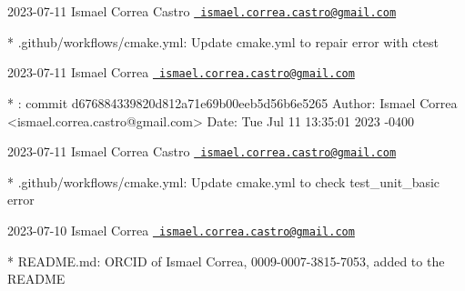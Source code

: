  2023-\/07-\/11 Ismael Correa Castro \href{mailto:ismael.correa.castro@gmail.com}{\texttt{ ismael.\+correa.\+castro@gmail.\+com}} \begin{DoxyVerb}* .github/workflows/cmake.yml: Update cmake.yml to repair error with
ctest
\end{DoxyVerb}
 2023-\/07-\/11 Ismael Correa \href{mailto:ismael.correa.castro@gmail.com}{\texttt{ ismael.\+correa.\+castro@gmail.\+com}} \begin{DoxyVerb}* : commit d676884339820d812a71e69b00eeb5d56b6e5265 Author: Ismael
Correa <ismael.correa.castro@gmail.com> Date:   Tue Jul 11 13:35:01
2023 -0400
\end{DoxyVerb}
 2023-\/07-\/11 Ismael Correa Castro \href{mailto:ismael.correa.castro@gmail.com}{\texttt{ ismael.\+correa.\+castro@gmail.\+com}} \begin{DoxyVerb}* .github/workflows/cmake.yml: Update cmake.yml to check
test_unit_basic error
\end{DoxyVerb}
 2023-\/07-\/10 Ismael Correa \href{mailto:ismael.correa.castro@gmail.com}{\texttt{ ismael.\+correa.\+castro@gmail.\+com}} \begin{DoxyVerb}* README.md: ORCID of Ismael Correa, 0009-0007-3815-7053, added to
the README
\end{DoxyVerb}
